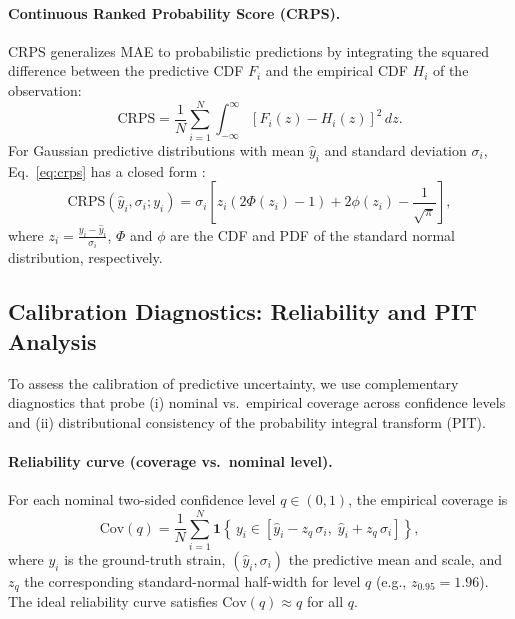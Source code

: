\documentclass{article}
\begin{document}
\paragraph{Continuous Ranked Probability Score (CRPS).}
CRPS generalizes MAE to probabilistic predictions by integrating the squared difference between the predictive CDF $F_i$ and the empirical CDF $H_i$ of the observation:
\begin{equation}
\label{eq:crps}
\mathrm{CRPS} = \frac{1}{N} \sum_{i=1}^N \int_{-\infty}^{\infty} \left[ F_i(z) - H_i(z) \right]^2 \, dz.
\end{equation}
For Gaussian predictive distributions with mean $\hat{y}_i$ and standard deviation $\sigma_i$, Eq.~\eqref{eq:crps} has a closed form \cite{Gneiting2007CRPS}:
\begin{equation}
\label{eq:crps-gaussian}
\mathrm{CRPS}(\hat{y}_i,\sigma_i;y_i) = \sigma_i \left[ z_i\left(2\Phi(z_i) - 1\right) + 2\phi(z_i) - \frac{1}{\sqrt{\pi}} \right],
\end{equation}
where $z_i = \frac{y_i - \hat{y}_i}{\sigma_i}$, $\Phi$ and $\phi$ are the CDF and PDF of the standard normal distribution, respectively.


\subsection{Calibration Diagnostics: Reliability and PIT Analysis}
\label{sec:reliability-pit}

To assess the calibration of predictive uncertainty, we use complementary diagnostics that probe (i) nominal vs.\ empirical coverage across confidence levels and (ii) distributional consistency of the probability integral transform (PIT).

\paragraph{Reliability curve (coverage vs.\ nominal level).}
For each nominal two-sided confidence level $q \in (0,1)$, the empirical coverage is
\begin{equation}
\label{eq:reliability}
\mathrm{Cov}(q) = \frac{1}{N} \sum_{i=1}^N \mathbf{1}\!\left\{\, y_i \in \left[ \hat{y}_i - z_{q}\,\sigma_i,\; \hat{y}_i + z_{q}\,\sigma_i \right] \right\},
\end{equation}
where $y_i$ is the ground-truth strain, $(\hat{y}_i,\sigma_i)$ the predictive mean and scale, and $z_q$ the corresponding standard-normal half-width for level $q$ (e.g., $z_{0.95}=1.96$). The ideal reliability curve satisfies $\mathrm{Cov}(q)\approx q$ for all $q$.
\end{document}
